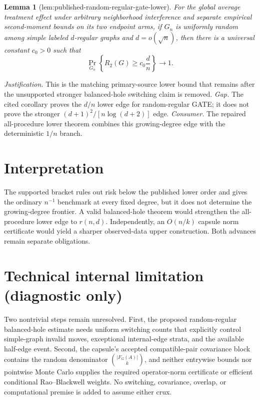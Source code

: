 \documentclass{article}
\newtheorem{lemma}{Lemma}
\begin{document}
\begin{lemma}[lem:published-random-regular-gate-lower]\label{lem:published-random-regular-gate-lower}
For the global average treatment effect under arbitrary neighborhood interference and separate empirical second-moment bounds on its two endpoint arms, if \(G_n\) is uniformly random among simple labeled \(d\)-regular graphs and \(d=o(\sqrt n)\), then there is a universal constant \(c_0>0\) such that
\[
\Pr_{G_n}\!\left\{R_2(G)\ge c_0\frac d n\right\}\longrightarrow1.
\]
\end{lemma}
\par\smallskip\noindent \textit{Justification.} This is the matching primary-source lower bound that remains after the unsupported stronger balanced-hole switching claim is removed. \textit{Gap.} The cited corollary proves the \(d/n\) lower edge for random-regular GATE; it does not prove the stronger \((d+1)^2/[n\log(d+2)]\) edge. \textit{Consumer.} The repaired all-procedure lower theorem combines this growing-degree edge with the deterministic \(1/n\) branch.

\section{Interpretation}

The supported bracket rules out risk below the published lower order and gives the ordinary \(n^{-1}\) benchmark at every fixed degree, but it does not determine the growing-degree frontier. A valid balanced-hole theorem would strengthen the all-procedure lower edge to \(r(n,d)\). Independently, an \(O(n/k)\) capsule norm certificate would yield a sharper observed-data upper construction. Both advances remain separate obligations.

\section*{Technical internal limitation (diagnostic only)}

Two nontrivial steps remain unresolved. First, the proposed random-regular balanced-hole estimate needs uniform switching counts that explicitly control simple-graph invalid moves, exceptional internal-edge strata, and the available half-edge event. Second, the capsule's accepted compatible-pair covariance block contains the random denominator \(\binom{|F_G(A)|}{k}\), and neither entrywise bounds nor pointwise Monte Carlo supplies the required operator-norm certificate or efficient conditional Rao--Blackwell weights. No switching, covariance, overlap, or computational premise is added to assume either crux.
\end{document}
